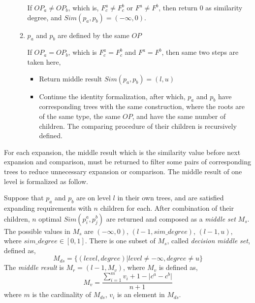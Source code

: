 \begin{itemize}
\begin{enumerate}
     If $OP_a \neq OP_b$, which is, $F_c^a \neq F_c^b$ or $F^a \neq F^b$, then return $0$ as similarity degree, and $Sim(p_a, p_b)=(-\infty,0)$. 
   
    \item $p_a$ and $p_b$ are defined by the same $OP$
   
     If $OP_a=OP_b$, which is $F_c^a=F_c^b$ and $F^a=F^b$, then
     same two steps are taken here,
    \begin{itemize}
     \item Return middle result $Sim(p_a,p_b)=(l,u)$
     \item Continue the identity formalization, after which, $p_a$ and $p_b$ have corresponding trees with the same construction, where the roots are of the same type, the same $OP$, and have the same number of children. The comparing procedure of their children is recursively defined.
\end{itemize}
   \end{enumerate}



\end{itemize}

For each expansion, the middle result which is the similarity value before next expansion and comparison, must be returned to filter some pairs of corresponding trees to reduce unnecessary expansion or comparison. The middle result of one level is formalized as follow.

Suppose that $p_a$ and $p_b$ are on level $l$ in their own trees, and are satisfied expanding requirements with $n$ children for each.
After combination of their children, $n$ optimal $Sim(p_i^a,p_j^b)$ are returned and composed as a \textit{middle set} $M_s$. The possible values in $M_s$ are $(-\infty,0)$, $(l-1,sim\_degree)$, $(l-1,u)$, where $sim\_degree \in [0,1]$. There is one subset of $M_s$, called \textit{decision middle set}, defined as,
\begin{equation}\label{eq:DecisionMiddleSet}
M_{ds}=\{(level,degree)| level \neq -\infty, degree \neq u\}
\end{equation}
The \textit{middle result} is $M_r = (l-1,M_v)$, where $M_v$ is defined as, 
\begin{equation}\label{eq:MiddleResult}
M_v=\frac{\sum_{i=1}^{m} v_i+1-\lvert c^a-c^b\rvert}{n+1}
\end{equation}
where $m$ is the cardinality of $M_{ds}$, $v_i$ is an element in $M_{ds}$. 

